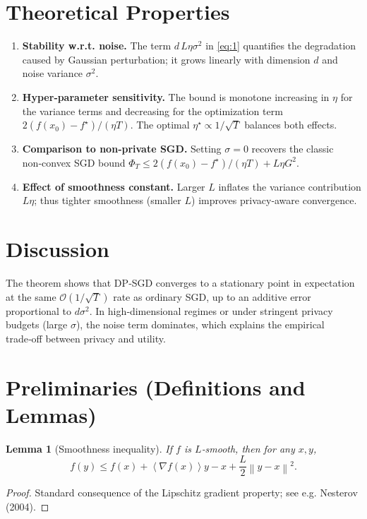 \documentclass{article}
\newtheorem{lemma}{Lemma}
\newcommand{\norm}[1]{\left\|#1\right\|}
\newcommand{\inner}[1]{\left\langle #1 \right\rangle}
\begin{document}
\section*{Theoretical Properties}
\begin{enumerate}[label=\arabic*)]
\item \textbf{Stability w.r.t. noise.} The term $d\,L\eta\sigma^{2}$ in \eqref{eq:1} quantifies the degradation caused by Gaussian perturbation; it grows linearly with dimension $d$ and noise variance $\sigma^{2}$.
\item \textbf{Hyper‑parameter sensitivity.} The bound is monotone increasing in $\eta$ for the variance terms and decreasing for the optimization term $2(f(x_{0})-f^{\star})/(\eta T)$. The optimal $\eta^{\star}\propto 1/\sqrt{T}$ balances both effects.
\item \textbf{Comparison to non‑private SGD.} Setting $\sigma=0$ recovers the classic non‑convex SGD bound $\Phi_{T}\le 2(f(x_{0})-f^{\star})/(\eta T)+L\eta G^{2}$.
\item \textbf{Effect of smoothness constant.} Larger $L$ inflates the variance contribution $L\eta$; thus tighter smoothness (smaller $L$) improves privacy‑aware convergence.
\end{enumerate}

\section*{Discussion}
The theorem shows that DP‑SGD converges to a stationary point in expectation at the same $\mathcal{O}(1/\sqrt{T})$ rate as ordinary SGD, up to an additive error proportional to $d\sigma^{2}$. In high‑dimensional regimes or under stringent privacy budgets (large $\sigma$), the noise term dominates, which explains the empirical trade‑off between privacy and utility.

\newpage
\section*{Preliminaries (Definitions and Lemmas)}
\begin{lemma}[Smoothness inequality]\label{lem:smooth}
If $f$ is $L$‑smooth, then for any $x,y$,
\[
f(y)\le f(x)+\inner{\nabla f(x)}{y-x}+\frac{L}{2}\norm{y-x}^{2}.
\]
\end{lemma}
\begin{proof}
Standard consequence of the Lipschitz gradient property; see e.g. Nesterov (2004). \qedhere
\end{proof}
\end{document}
